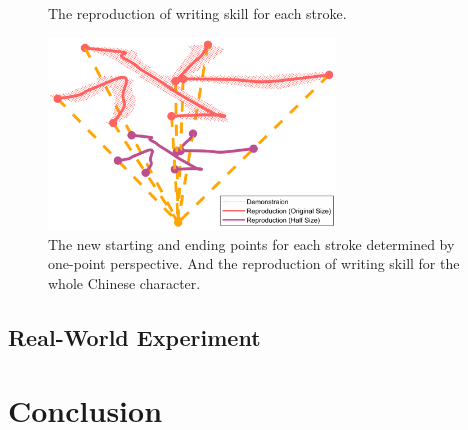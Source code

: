 \documentclass[journal]{IEEEtran}
\begin{document}
\begin{figure}[!t]
    \centering
    \quad
    \caption{The reproduction of writing skill for each stroke.}
    \label{fig6}
\end{figure}

\begin{figure}[!t]
    \centering
    \includegraphics[width=3in]{./fig/fig7.pdf}
    \caption{The new starting and ending points for each stroke determined by one-point perspective. And the reproduction of writing skill for the whole Chinese character.}
    \label{fig7}
\end{figure}

\subsection{Real-World Experiment}

\section{Conclusion}


\end{document}
